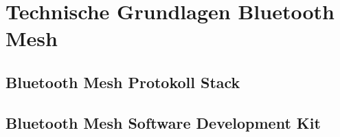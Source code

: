\clearpage
\section{Technische Grundlagen Bluetooth Mesh}\label{sec:TechnischeGrundlagenBluetoothMesh}


\subsection{Bluetooth Mesh Protokoll Stack}\label{sec:ZigbeeProtokollStack}

\subsection{Bluetooth Mesh Software Development Kit}\label{sec:ZigbeeSoftwareDevelopmentKit}


